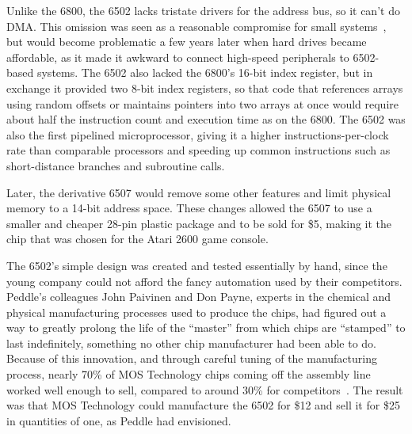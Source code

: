 \begin{tangent}
    Unlike the 6800, the 6502 lacks
    tristate drivers for the address bus, so it can't do DMA.  This
    omission was seen as a reasonable compromise
    for small systems~\cite{byte75:6502}, but would become
    problematic a few years later when hard drives became affordable, as
    it made it awkward to connect high-speed peripherals to 6502-based systems.
    The 6502 also lacked the 6800's 16-bit index register, but in exchange
    it provided two
     8-bit index registers, so that code that references arrays using
     random offsets or maintains pointers into two arrays at once would
     require about half the instruction count and execution time as on
     the 6800.
    The 6502 was also the first pipelined
    microprocessor, giving it a higher instructions-per-clock 
    rate than comparable processors and speeding up
    common instructions such as short-distance branches
     and subroutine calls.

    Later, the derivative 6507 would
    remove some other features and limit
    physical memory to a 14-bit address space.  These changes allowed
    the 6507 to
    use a smaller and cheaper 28-pin 
    plastic package and to be sold for \$5,
    making it the chip that was chosen for the Atari 2600 game console.
\end{tangent}

The 6502's simple design was created and tested essentially by hand,
since the young company could not afford the
fancy automation used by their competitors.
Peddle's colleagues John Paivinen and Don Payne, experts in the chemical
and physical manufacturing processes used to produce the chips, had
figured out a way to greatly prolong the life of the ``master'' from which chips
are ``stamped'' to last indefinitely,
something no other chip manufacturer had been able to do.
Because of this innovation, and through careful tuning of the manufacturing process,
nearly 70\% of MOS Technology chips coming off the assembly line
worked well enough to sell, 
compared to around 30\% for competitors~\cite{commodore}.
The result was that MOS Technology could manufacture the 6502 for \$12
and sell it for \$25 in  quantities of one, as Peddle had envisioned.

